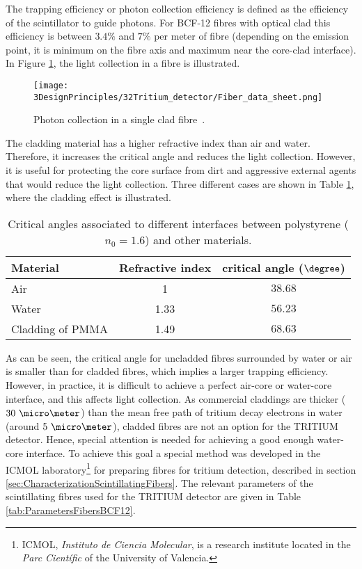 The trapping efficiency or photon collection efficiency is defined as the efficiency of the scintillator to guide photons. For BCF-12 fibres with optical clad this efficiency is between $3.4\%$ and $7\%$ per meter of fibre (depending on the emission point, it is minimum on the fibre axis and maximum near the core-clad interface). In Figure \ref{fig:Fiber_physic}, the light collection in a fibre is illustrated.


\begin{figure}[htbp]
\centering
\texttt{[image: 3DesignPrinciples/32Tritium\_detector/Fiber\_data\_sheet.png]}
\caption{Photon collection in a single clad fibre\label{fig:Fiber_physic}~\cite{DataSheetBCF12Fiber}.}
\end{figure}
The cladding material has a higher refractive index than air and water. Therefore, it increases the critical angle and reduces the light collection. However, it is useful for protecting the core surface from dirt and aggressive external agents that would reduce the light collection. Three different cases are shown in Table \ref{tab:CriticalAngles}, where the cladding effect is illustrated.
\begin{table}[t]
\centering{}%
\begin{tabular}{lcc}
\toprule 
Material & Refractive index & critical angle ($\degree$) \tabularnewline
\midrule
\midrule 
Air & 1 & $38.68$ \tabularnewline
Water & 1.33 & $56.23$ \tabularnewline
Cladding of PMMA & 1.49 & $68.63$ \tabularnewline
\bottomrule
\end{tabular}
\caption{Critical angles associated to different interfaces between polystyrene ($n_0=1.6$) and other materials.}
\label{tab:CriticalAngles}
\end{table}
As can be seen, the critical angle for uncladded fibres surrounded by water or air is smaller than for cladded fibres, which implies a larger trapping efficiency. However, in practice, it is difficult to achieve a perfect air-core or water-core interface, and this affects light collection. As commercial claddings are thicker ($30~\micro \meter$) than the mean free path of tritium decay electrons in water (around $5~\micro\meter$), cladded fibres are not an option for the TRITIUM detector. Hence, special attention is needed for achieving a good enough water-core interface. To achieve this goal a special method was developed in the ICMOL laboratory\footnote{ICMOL, \textit{Instituto de Ciencia Molecular}, is a research institute located in the \textit{Parc Científic} of the University of Valencia.} for preparing fibres for tritium detection, described in section \ref{sec:CharacterizationScintillatingFibers}. The relevant parameters of the scintillating fibres used for the TRITIUM detector are given in Table \ref{tab:ParametersFibersBCF12}.

